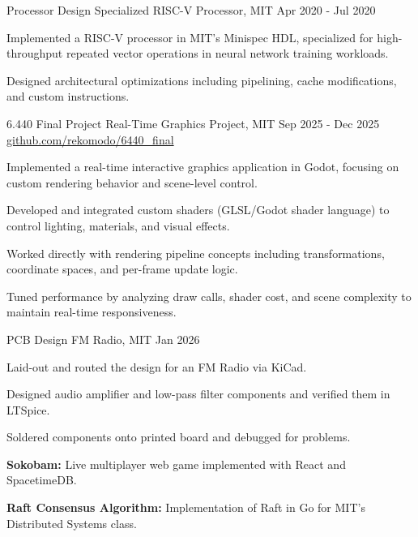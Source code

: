 \ifdefined\showProcessorDesignProject
\resumeSubHeadingListStart
\resumeProject
{Processor Design}
{Specialized RISC-V Processor, MIT}
{Apr 2020 - Jul 2020}
{}
\resumeItemListStart
\item[$\bullet$] Implemented a RISC-V processor in MIT's Minispec HDL, specialized for high-throughput repeated vector operations in neural network training workloads.
\item[$\bullet$] Designed architectural optimizations including pipelining, cache modifications, and custom instructions.
\resumeItemListEnd
\resumeSubHeadingListEnd
\fi

\ifdefined\showRealTimeGraphicsProject
\resumeSubHeadingListStart
\resumeProject
{6.440 Final Project}
{Real-Time Graphics Project, MIT}
{Sep 2025 - Dec 2025}
{\href{https://github.com/rekomodo/6440_final}{github.com/rekomodo/6440_final}}
\resumeItemListStart
\item[$\bullet$] Implemented a real-time interactive graphics application in Godot, focusing on custom rendering behavior and scene-level control.
\item[$\bullet$] Developed and integrated custom shaders (GLSL/Godot shader language) to control lighting, materials, and visual effects.
\item[$\bullet$] Worked directly with rendering pipeline concepts including transformations, coordinate spaces, and per-frame update logic.
\item[$\bullet$] Tuned performance by analyzing draw calls, shader cost, and scene complexity to maintain real-time responsiveness.
\resumeItemListEnd
\resumeSubHeadingListEnd
\fi

\ifdefined\showFMRadiopcbProject
\resumeSubHeadingListStart
\resumeProject
{PCB Design}
{FM Radio, MIT}
{Jan 2026}
{}
\resumeItemListStart
\item[$\bullet$] Laid-out and routed the design for an FM Radio via KiCad.
\item[$\bullet$] Designed audio amplifier and low-pass filter components and verified them in LTSpice.
\item[$\bullet$] Soldered components onto printed board and debugged for problems.
\resumeItemListEnd
\resumeSubHeadingListEnd
\fi

\ifdefined\showOtherProjectsEntry
\resumeSubHeadingListStart
{}
\resumeItemListStart
\item[$\bullet$] \textbf{Sokobam:} Live multiplayer web game implemented with React and SpacetimeDB.
\item[$\bullet$] \textbf{Raft Consensus Algorithm:} Implementation of Raft in Go for MIT's Distributed Systems class.
\resumeItemListEnd
\resumeSubHeadingListEnd
\fi
